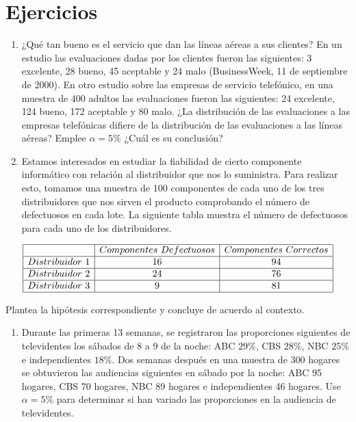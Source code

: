 \documentclass[a4paper,oneside,openany]{book}
\providecommand{\tightlist}{%
  \setlength{\itemsep}{0pt}\setlength{\parskip}{0pt}}
\begin{document}
\section{Ejercicios}\label{ejercicios-11}

\begin{enumerate}
\def\labelenumi{\arabic{enumi}.}
\item
  ¿Qué tan bueno es el servicio que dan las líneas aéreas a sus
  clientes? En un estudio las evaluaciones dadas por los clientes fueron
  las siguientes: 3 excelente, 28 bueno, 45 aceptable y 24 malo
  (BusinessWeek, 11 de septiembre de 2000). En otro estudio sobre las
  empresas de servicio telefónico, en una muestra de 400 adultos las
  evaluaciones fueron las siguientes: 24 excelente, 124 bueno, 172
  aceptable y 80 malo. ¿La distribución de las evaluaciones a las
  empresas telefónicas difiere de la distribución de las evaluaciones a
  las líneas aéreas? Emplee \(\alpha=5\%\) ¿Cuál es su conclusión?
\item
  Estamos interesados en estudiar la fiabilidad de cierto componente
  informático con relación al distribuidor que nos lo suministra. Para
  realizar esto, tomamos una muestra de 100 componentes de cada uno de
  los tres distribuidores que nos sirven el producto comprobando el
  número de defectuosos en cada lote. La siguiente tabla muestra el
  número de defectuosos para cada uno de los distribuidores.
\end{enumerate}

\[
\begin{equation*}
\begin{array}{|c | c| c|}
\hline
&Componentes\ Defectuosos& Componentes\ Correctos\\
   \hline
Distribuidor\ 1& 16& 94  \\
  \hline
 Distribuidor\ 2&24&76\\
 \hline
Distribuidor\ 3&9&81\\
    \hline
\end{array}
\end{equation*}
\]

Plantea la hipótesis correspondiente y concluye de acuerdo al contexto.

\begin{enumerate}
\def\labelenumi{\arabic{enumi}.}
\setcounter{enumi}{2}
\tightlist
\item
  Durante las primeras 13 semanas, se registraron las proporciones
  siguientes de televidentes los sábados de 8 a 9 de la noche: ABC
  \(29\%\), CBS \(28\%\), NBC \(25\%\) e independientes \(18\%\). Dos
  semanas después en una muestra de 300 hogares se obtuvieron las
  audiencias siguientes en sábado por la noche: ABC 95 hogares, CBS 70
  hogares, NBC 89 hogares e independientes 46 hogares. Use
  \(\alpha=5\%\) para determinar si han variado las proporciones en la
  audiencia de televidentes.
\end{enumerate}
\end{document}

